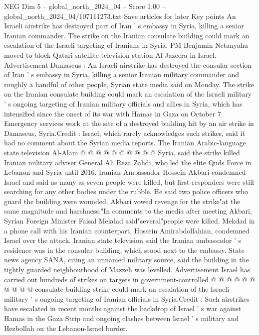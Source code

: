 \begin{textsample}{NEG Dim 5 – global\_north\_2024\_04 – Score 1.00 – global\_north\_2024\_04/107111273.txt}  \label{ex:f5_neg_168}
Save articles for later Key points An Israeli airstrike has destroyed part of Iran ' s embassy in Syria, killing a senior Iranian commander.
The strike on the Iranian consulate building could mark an escalation of the Israeli targeting of Iranians in Syria.
PM Benjamin Netanyahu moved to block Qatari satellite television station Al Jazeera in Israel.
Advertisement Damascus : An Israeli airstrike has destroyed the consular section of Iran ' s embassy in Syria, killing a senior Iranian military commander and roughly a handful of other people, Syrian state media said on Monday.
The strike on the Iranian consulate building could mark an escalation of the Israeli military ' s ongoing targeting of Iranian military officials and allies in Syria, which has intensified since the onset of its war with Hamas in Gaza on October 7.
Emergency services work at the site of a destroyed building hit by an air strike in Damascus, Syria.Credit : Israel, which rarely acknowledges such strikes, said it had no comment about the Syrian media reports.
The Iranian Arabic-language state television Al-Alam @ @ @ @ @ @ @ @ @ @ Syria, said the strike killed Iranian military adviser General Ali Reza Zahdi, who led the elite Quds Force in Lebanon and Syria until 2016.
Iranian Ambassador Hossein Akbari condemned Israel and said as many as seven people were killed, but first responders were still searching for any other bodies under the rubble.
He said two police officers who guard the building were wounded.
Akbari vowed revenge for the strike"at the same magnitude and harshness."In comments to the media after meeting Akbari, Syrian Foreign Minister Faisal Mekdad said"several"people were killed.
Mekdad in a phone call with his Iranian counterpart, Hossein Amirabdollahian, condemned Israel over the attack.
Iranian state television said the Iranian ambassador ' s residence was in the consular building, which stood next to the embassy.
State news agency SANA, citing an unnamed military source, said the building in the tightly guarded neighbourhood of Mazzeh was levelled.
Advertisement Israel has carried out hundreds of strikes on targets in government-controlled @ @ @ @ @ @ @ @ @ @ consulate building strike could mark an escalation of the Israeli military ' s ongoing targeting of Iranian officials in Syria.Credit : Such airstrikes have escalated in recent months against the backdrop of Israel ' s war against Hamas in the Gaza Strip and ongoing clashes between Israel ' s military and Hezbollah on the Lebanon-Israel border.

\end{textsample}
